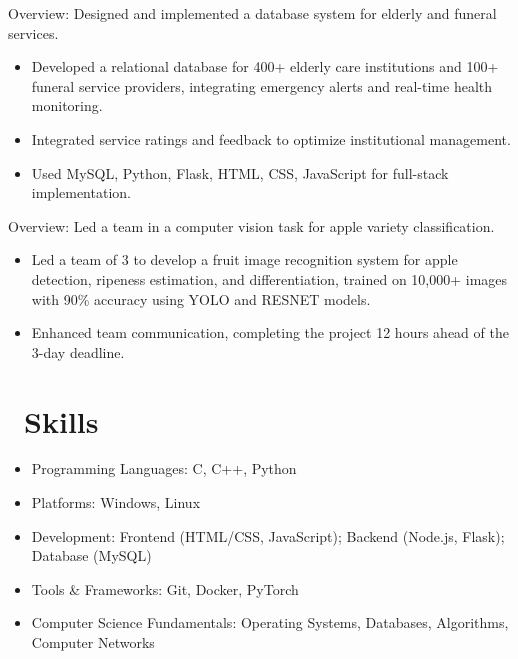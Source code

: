 \documentclass{resume}
\begin{document}
Overview: Designed and implemented a database system for elderly and funeral services.
\begin{itemize}
  \item Developed a relational database for 400+ elderly care institutions and 100+ funeral service providers, integrating emergency alerts and real-time health monitoring.  
  \item Integrated service ratings and feedback to optimize institutional management.
  \item Used MySQL, Python, Flask, HTML, CSS, JavaScript for full-stack implementation.
\end{itemize}

Overview: Led a team in a computer vision task for apple variety classification. 
\begin{itemize}
  \item Led a team of 3 to develop a fruit image recognition system for apple detection, ripeness estimation, and differentiation, trained on 10,000+ images with 90\% accuracy using YOLO and RESNET models.  
  \item Enhanced team communication, completing the project 12 hours ahead of the 3-day deadline.
\end{itemize}


\section{\faCogs\ Skills}
\begin{itemize}[parsep=0.5ex]
  \item Programming Languages: C, C++, Python
  \item Platforms: Windows, Linux
  \item Development: Frontend (HTML/CSS, JavaScript); Backend (Node.js, Flask); Database (MySQL)
  \item Tools \& Frameworks: Git, Docker, PyTorch
  \item Computer Science Fundamentals: Operating Systems, Databases, Algorithms, Computer Networks
\end{itemize}
\end{document}
